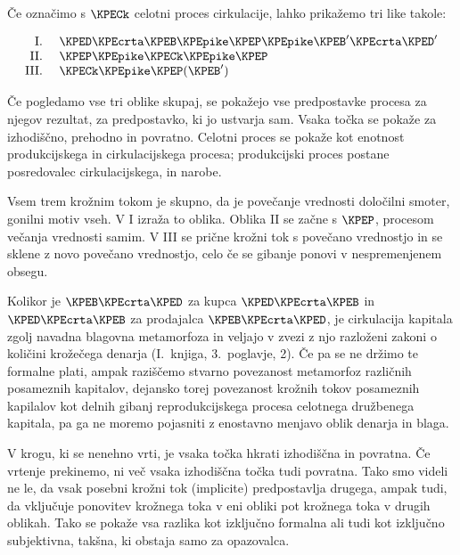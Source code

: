 \documentclass[kapital_02.tex]{subfiles}
\begin{document}
Če \KPEstran označimo s \( \KPECk \)  celotni proces cirkulacije, lahko prikažemo tri like takole:

\[
    \begin{array}{r l}
        \textrm{I. } & \KPED \KPEcrta \KPEB \KPEpike \KPEP \KPEpike \KPEB' \KPEcrta \KPED' \\
        \textrm{II. } & \KPEP \KPEpike \KPECk \KPEpike \KPEP \\
        \textrm{III. } & \KPECk \KPEpike \KPEP (\KPEB') \\
    \end{array}
\]

Če pogledamo vse tri oblike skupaj, se pokažejo vse predpostavke procesa za njegov rezultat, za predpostavko, ki jo ustvarja sam. Vsaka točka se pokaže za izhodiščno, prehodno in povratno. Celotni proces se pokaže kot enotnost produkcijskega in cirkulacijskega procesa; produkcijski proces postane posredovalec cirkulacijskega, in narobe.

Vsem trem krožnim tokom je skupno, da je povečanje vrednosti določilni smoter, gonilni motiv vseh. V I izraža to oblika. Oblika II se začne s \( \KPEP \), procesom večanja vrednosti samim. V III se prične krožni tok s povečano vrednostjo in se sklene z novo povečano vrednostjo, celo če se gibanje ponovi v nespremenjenem obsegu.

Kolikor je \( \KPEB \KPEcrta \KPED \) za kupca \( \KPED \KPEcrta \KPEB \) in \( \KPED \KPEcrta \KPEB \) za prodajalca \( \KPEB \KPEcrta \KPED \), je cirkulacija kapitala zgolj navadna blagovna metamorfoza in veljajo v zvezi z njo razloženi zakoni o količini krožečega denarja (I.\ knjiga, 3.\ poglavje, 2). Če pa se ne držimo te formalne plati, ampak raziščemo stvarno povezanost metamorfoz različnih posameznih kapitalov, dejansko torej povezanost krožnih tokov posameznih kapilalov kot delnih gibanj reprodukcijskega procesa celotnega družbenega \KPEstran kapitala, pa ga ne moremo pojasniti z enostavno menjavo oblik denarja in blaga.

V krogu, ki se nenehno vrti, je vsaka točka hkrati izhodiščna in povratna. Če vrtenje prekinemo, ni več vsaka izhodiščna točka tudi povratna. Tako smo videli ne le, da vsak posebni krožni tok (implicite) predpostavlja drugega, ampak tudi, da vključuje ponovitev krožnega toka v eni obliki pot krožnega toka v drugih oblikah. Tako se pokaže vsa razlika kot izključno formalna ali tudi kot izključno subjektivna, takšna, ki obstaja samo za opazovalca.
\end{document}
